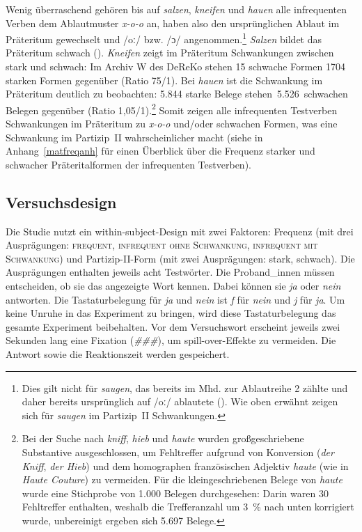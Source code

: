 Wenig überraschend gehören bis auf \textit{salzen}, \textit{kneifen} und \textit{hauen} alle infrequenten Verben dem Ablautmuster \textit{x-o-o} an, haben also den ursprünglichen Ablaut im Präteritum gewechselt und /oː/ bzw. /ɔ/ angenommen.\footnote{Dies gilt nicht für \textit{saugen}, das bereits im Mhd. zur Ablautreihe 2 zählte und daher bereits ursprünglich auf /oː/ ablautete (\cite[233]{Nowak.2015}). Wie oben erwähnt zeigen sich für \textit{saugen} im Partizip~II Schwankungen.}  \textit{Salzen} bildet das Präteritum schwach (\cite{Duden.2020}). \textit{Kneifen} zeigt im Präteritum Schwankungen zwischen stark und schwach: Im Archiv W des DeReKo stehen 15 schwache Formen 1704 starken Formen gegenüber (Ratio 75/1). Bei \textit{hauen} ist die Schwankung im Präteritum deutlich zu beobachten: 5.844 starke Belege stehen~5.526~schwachen Belegen gegenüber (Ratio 1,05/1).\footnote{Bei der Suche nach \textit{kniff}, \textit{hieb} und \textit{haute} wurden großgeschriebene Substantive ausgeschlossen, um Fehltreffer aufgrund von Konversion (\textit{der Kniff}, \textit{der Hieb}) und dem homographen französischen Adjektiv \textit{haute} (wie in \textit{Haute Couture}) zu vermeiden. Für die kleingeschriebenen Belege von \textit{haute} wurde eine Stichprobe von 1.000 Belegen durchgesehen: Darin waren 30 Fehltreffer enthalten, weshalb die Trefferanzahl um 3~\% nach unten korrigiert wurde, unbereinigt ergeben sich 5.697 Belege.} Somit zeigen alle infrequenten Testverben Schwankungen im Präteritum zu \textit{x-o-o} und/oder schwachen Formen, was eine Schwankung im Partizip~II wahrscheinlicher macht (siehe  in Anhang~\ref{matfreqanh} für einen Überblick über die Frequenz starker und schwacher Präteritalformen der infrequenten Testverben).

\subsection{Versuchsdesign}
\label{studiefreqdesign}

 Die Studie nutzt ein within-subject-Design mit zwei Faktoren: Frequenz  (mit drei Ausprägungen: \textsc{frequent}, \textsc{infrequent ohne Schwankung}, \textsc{infrequent mit Schwankung}) und Partizip-II-Form (mit zwei Ausprägungen: stark, schwach). Die Ausprägungen enthalten jeweils acht Testwörter. Die Proband\_innen müssen entscheiden, ob sie das angezeigte Wort kennen. Dabei können sie \textit{ja} oder \textit{nein} antworten. Die Tastaturbelegung für \textit{ja} und \textit{nein} ist \textit{f} für \textit{nein} und \textit{j} für \textit{ja}. Um keine Unruhe in das Experiment zu bringen, wird diese Tastaturbelegung das gesamte Experiment beibehalten. Vor dem Versuchswort erscheint jeweils zwei Sekunden lang eine Fixation (\textit{\#\#\#}), um spill-over-Effekte zu vermeiden. Die Antwort sowie die Reaktionszeit werden gespeichert. 

